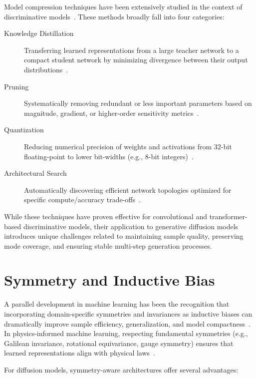 \documentclass[12pt]{report}
\theoremstyle{definition}
\begin{document}
Model compression techniques have been extensively studied in the context of discriminative models~\citep{hinton2015distilling, han2015deep, jacob2018quantization}. These methods broadly fall into four categories:

\begin{description}
    \item[Knowledge Distillation] Transferring learned representations from a large teacher network to a compact student network by minimizing divergence between their output distributions~\citep{hinton2015distilling}.
    \item[Pruning] Systematically removing redundant or less important parameters based on magnitude, gradient, or higher-order sensitivity metrics~\citep{han2015learning, molchanov2016pruning}.
    \item[Quantization] Reducing numerical precision of weights and activations from 32-bit floating-point to lower bit-widths (e.g., 8-bit integers)~\citep{jacob2018quantization, krishnamoorthi2018quantizing}.
    \item[Architectural Search] Automatically discovering efficient network topologies optimized for specific compute/accuracy trade-offs~\citep{tan2019efficientnet}.
\end{description}

While these techniques have proven effective for convolutional and transformer-based discriminative models, their application to generative diffusion models introduces unique challenges related to maintaining sample quality, preserving mode coverage, and ensuring stable multi-step generation processes.

\section{Symmetry and Inductive Bias}

A parallel development in machine learning has been the recognition that incorporating domain-specific symmetries and invariances as inductive biases can dramatically improve sample efficiency, generalization, and model compactness~\citep{cohen2016group, bronstein2021geometric}. In physics-informed machine learning, respecting fundamental symmetries (e.g., Galilean invariance, rotational equivariance, gauge symmetry) ensures that learned representations align with physical laws~\citep{cranmer2020discovering}.

For diffusion models, symmetry-aware architectures offer several advantages:
\end{document}
